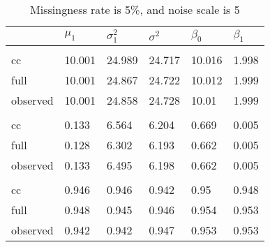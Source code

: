 \documentclass[
  twocolumn]{article}
\begin{document}
\begin{table}[h]
\caption{Missingness rate is 5\%, and noise scale is 5}
\begingroup\fontsize{7}{9}\selectfont

\begin{tabu} to 
\toprule
 & $\mu_1$ & $\sigma^2_1$ & $\sigma^2$ & $\beta_0$ & $\beta_1$\\
\midrule
\addlinespace[0.3em]
\\
\hspace{1em}cc & 10.001 & 24.989 & 24.717 & 10.016 & 1.998\\
\hspace{1em}full & 10.001 & 24.867 & 24.722 & 10.012 & 1.999\\
\hspace{1em}observed & 10.001 & 24.858 & 24.728 & 10.01 & 1.999\\
\addlinespace[0.3em]
\\
\hspace{1em}cc & 0.133 & 6.564 & 6.204 & 0.669 & 0.005\\
\hspace{1em}full & 0.128 & 6.302 & 6.193 & 0.662 & 0.005\\
\hspace{1em}observed & 0.133 & 6.495 & 6.198 & 0.662 & 0.005\\
\addlinespace[0.3em]
\\
\hspace{1em}cc & 0.946 & 0.946 & 0.942 & 0.95 & 0.948\\
\hspace{1em}full & 0.948 & 0.945 & 0.946 & 0.954 & 0.953\\
\hspace{1em}observed & 0.942 & 0.942 & 0.947 & 0.953 & 0.953\\
\bottomrule
\end{tabu}
\endgroup{}
\end{table}
\end{document}
